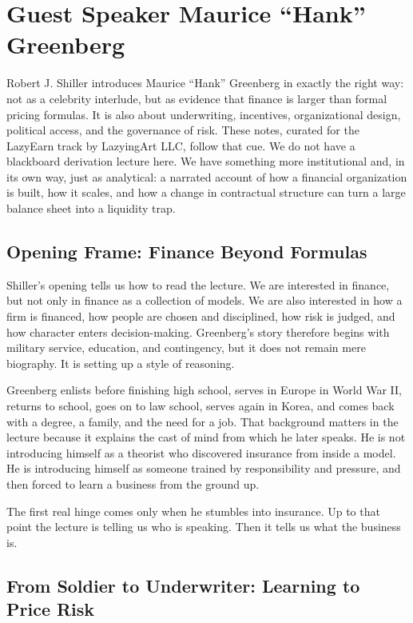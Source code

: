 \chapter{Guest Speaker Maurice ``Hank'' Greenberg}

Robert J. Shiller introduces Maurice ``Hank'' Greenberg in exactly the right way: not as a celebrity interlude, but as evidence that finance is larger than formal pricing formulas. It is also about underwriting, incentives, organizational design, political access, and the governance of risk. These notes, curated for the LazyEarn track by LazyingArt LLC, follow that cue. We do not have a blackboard derivation lecture here. We have something more institutional and, in its own way, just as analytical: a narrated account of how a financial organization is built, how it scales, and how a change in contractual structure can turn a large balance sheet into a liquidity trap.

\section{Opening Frame: Finance Beyond Formulas}

Shiller's opening tells us how to read the lecture. We are interested in finance, but not only in finance as a collection of models. We are also interested in how a firm is financed, how people are chosen and disciplined, how risk is judged, and how character enters decision-making. Greenberg's story therefore begins with military service, education, and contingency, but it does not remain mere biography. It is setting up a style of reasoning.

Greenberg enlists before finishing high school, serves in Europe in World War II, returns to school, goes on to law school, serves again in Korea, and comes back with a degree, a family, and the need for a job. That background matters in the lecture because it explains the cast of mind from which he later speaks. He is not introducing himself as a theorist who discovered insurance from inside a model. He is introducing himself as someone trained by responsibility and pressure, and then forced to learn a business from the ground up.

The first real hinge comes only when he stumbles into insurance. Up to that point the lecture is telling us who is speaking. Then it tells us what the business is.

\section{From Soldier to Underwriter: Learning to Price Risk}

